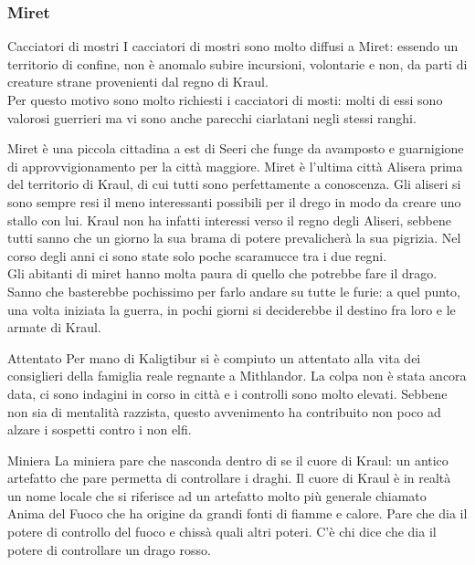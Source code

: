 \subsubsection{Miret}
\begin{commentbox}{Cacciatori di mostri}
  I cacciatori di mostri sono molto diffusi a Miret: essendo un territorio di confine,
  non \`e anomalo subire incursioni, volontarie e non, da parti di creature strane
  provenienti dal regno di Kraul.\\
  Per questo motivo sono molto richiesti i cacciatori di mosti: molti di essi sono valorosi
  guerrieri ma vi sono anche parecchi ciarlatani negli stessi ranghi.
\end{commentbox}
Miret \`e una piccola cittadina a est di Seeri che funge da avamposto e guarnigione di
approvvigionamento per la citt\`a maggiore. Miret \`e l'ultima citt\`a Alisera prima del
territorio di Kraul, di cui tutti sono perfettamente a conoscenza.
Gli aliseri si sono sempre resi il meno interessanti possibili per il drego in modo da
creare uno stallo con lui. Kraul non ha infatti interessi verso il regno degli Aliseri,
sebbene tutti sanno che un giorno la sua brama di potere prevalicher\`a la sua
pigrizia. Nel corso degli anni ci sono state solo poche scaramucce tra i due regni.\\
Gli abitanti di miret hanno molta paura di quello che potrebbe fare il drago.
Sanno che basterebbe pochissimo per farlo andare su tutte le furie: a quel punto,
una volta iniziata la guerra, in pochi giorni si deciderebbe il destino fra loro
e le armate di Kraul.
\begin{commentbox}{Attentato}
  Per mano di Kaligtibur si \`e compiuto un attentato alla vita dei consiglieri della
  famiglia reale regnante a Mithlandor. La colpa non \`e stata ancora data, ci sono
  indagini in corso in citt\`a e i controlli sono molto elevati. Sebbene non sia di
  mentalit\`a razzista, questo avvenimento ha contribuito non poco ad alzare
  i sospetti contro i non elfi.
\end{commentbox}
\begin{commentbox}{Miniera}
  La miniera pare che nasconda dentro di se il cuore di Kraul: un antico artefatto che
  pare permetta di controllare i draghi. Il cuore di Kraul \`e in realt\`a un nome
  locale che si riferisce ad un artefatto molto pi\`u generale chiamato Anima del
  Fuoco che ha origine da grandi fonti di fiamme e calore. Pare che dia il potere di
  controllo del fuoco e chiss\`a quali altri poteri. C'\`e chi dice che dia
  il potere di controllare un drago rosso.
\end{commentbox}